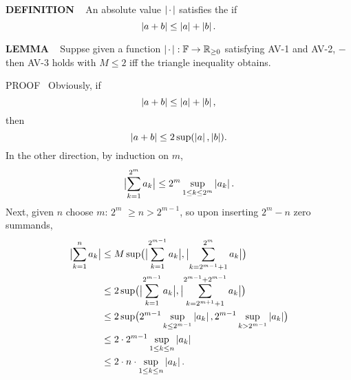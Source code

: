 \begin{x}{\small\bf DEFINITION} \ %
An absolute value $\left\vert\hspace{0.05cm} \cdot \hspace{0.05cm}\right\vert$ satisfies the 
if
\[
\left\vert a + b\right\vert \le \left\vert a\right\vert + \left\vert b\right\vert.
\]
\end{x}

\vspace{0.1cm}

\begin{x}{\small\bf LEMMA} \ %
Suppse given a function $\left\vert\hspace{0.05cm} \cdot \hspace{0.05cm}\right\vert : \mathbb{F} \rightarrow \mathbb{R}_{\ge 0}$ satisfying AV-1 and AV-2, 
$-$then AV-3 holds with $M \le 2$  iff the triangle inequality obtains.

PROOF \   Obviously, if 
\[
\left\vert a + b\right\vert \le \left\vert a\right\vert + \left\vert b\right\vert,
\]
then
 \[
 \left\vert a + b\right\vert \le 2 \sup( \left\vert a\right\vert,  \left\vert b\right\vert).
\]
In the other direction, by induction on $m$, 
\[
\bigl|\sum_{k=1}^{2^m} a_{k} \bigr | \le 2^m \sup\limits_{1 \leq k \leq 2^m} \left\vert a_k\right\vert.
\]
Next, given $n$ choose $m$: $2^m$ $\ge n > 2^{m-1}$, so upon inserting $2^m - n$ zero summands,
\[
\allowdisplaybreaks
\begin{aligned}
\allowdisplaybreaks
\bigl|\sum_{k=1}^{n} a_{k} \bigr | 
&\le M \sup \bigl(\bigl|\sum_{k=1}^{2^{m-1}} a_{k}\bigr | , \bigl|\sum_{k=2^{m-1}+1}^{2^m} a_{k} \bigr | \bigr )\\
& \le 2 \sup \bigl(\bigl|\sum_{k=1}^{2^{m-1}} a_{k} \bigr | ,\bigl|\sum_{k=2^{m+1} + 1}^{2^{m-1} + 2^{m-1}} a_{k} \bigr | \bigr)\\
& \le 2 \sup \bigl(2^{m-1} \sup_{k \le 2^{m-1}}\abs{a_k},    2^{m-1} \sup_{k > 2^{m-1}}\abs{a_k}\bigr) \\
& \le 2 \cdot 2^{m-1} \sup_{1 \le k \le n}\abs{a_k} \\
& \le 2 \cdot n \cdot \sup_{1 \le k \le n}\abs{a_k}.
\end{aligned}
\]


\end{x}
